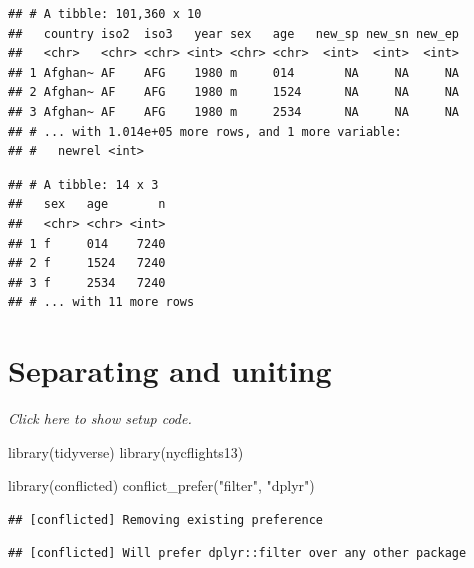 \documentclass[]{book}
\newenvironment{Shaded}{}{}
\newcommand{\KeywordTok}[1]{\textcolor[rgb]{0.00,0.00,1.00}{#1}}
\newcommand{\NormalTok}[1]{#1}
\newcommand{\OperatorTok}[1]{#1}
\newcommand{\StringTok}[1]{\textcolor[rgb]{0.00,0.50,0.50}{#1}}
\begin{document}
\begin{verbatim}
## # A tibble: 101,360 x 10
##   country iso2  iso3   year sex   age   new_sp new_sn new_ep
##   <chr>   <chr> <chr> <int> <chr> <chr>  <int>  <int>  <int>
## 1 Afghan~ AF    AFG    1980 m     014       NA     NA     NA
## 2 Afghan~ AF    AFG    1980 m     1524      NA     NA     NA
## 3 Afghan~ AF    AFG    1980 m     2534      NA     NA     NA
## # ... with 1.014e+05 more rows, and 1 more variable:
## #   newrel <int>
\end{verbatim}

\begin{Shaded}
\end{Shaded}

\begin{verbatim}
## # A tibble: 14 x 3
##   sex   age       n
##   <chr> <chr> <int>
## 1 f     014    7240
## 2 f     1524   7240
## 3 f     2534   7240
## # ... with 11 more rows
\end{verbatim}

\hypertarget{separating-and-uniting}{%
\section{Separating and uniting}\label{separating-and-uniting}}

\emph{Click here to show setup code.}

\begin{Shaded}
\begin{Highlighting}[]
\KeywordTok{library}\NormalTok{(tidyverse)}
\KeywordTok{library}\NormalTok{(nycflights13)}

\KeywordTok{library}\NormalTok{(conflicted)}
\KeywordTok{conflict_prefer}\NormalTok{(}\StringTok{"filter"}\NormalTok{, }\StringTok{"dplyr"}\NormalTok{)}
\end{Highlighting}
\end{Shaded}

\begin{verbatim}
## [conflicted] Removing existing preference
\end{verbatim}

\begin{verbatim}
## [conflicted] Will prefer dplyr::filter over any other package
\end{verbatim}
\end{document}
